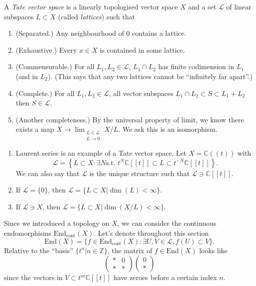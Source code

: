 \begin{definition}
\label{definition-tate}
A {\it Tate vector space} is a linearly
topologised vector space $X$ and a set
$\mathcal{L}$
of linear subspaces $L \subset X$
(called {\it lattices}) such that
\begin{enumerate}
\item (Separated.) Any neighbourhood of $0$
contains
a lattice.

\item (Exhaustive.) Every $x \in X$
is contained in some lattice.

\item (Commensurable.) For all $L_1,L_2 \in
\mathcal{L}$,
$L_1 \cap L_2$ has finite codimension
in $L_1$ (and in $L_2$). (This says
that any two lattices cannot be
``infinitely far apart''.)

\item (Complete.) For all $L_1,L_2 \in
\mathcal{L}$,
all vector subspaces
$L_1 \cap L_2 \subset S \subset L_1+L_2$
then $S \in \mathcal{L}$.

\item (Another completeness.) By the
universal property of limit,
we know there exists a map
$X \to \lim_{\substack{L \in \mathcal{L} \\ L
\to 0}} X/L$.
We ask this is an isomorphism.
\end{enumerate}
\end{definition}

\begin{example}
\label{example-tate-vector-space}
\begin{enumerate}
\item
Laurent series is an example of a Tate vector
space.
Let $X=\mathbb{C}(\!(t)\!)$ with
 $$
\mathcal{L}=\left\{L\subset X:\exists N\text{
s.t. }
t^N \mathbb{C}[\![t]\!] \subset L \subset
t^{-N}\mathbb{C}[\![t]\!]\right\}.
$$
We can also say that $\mathcal{L}$ is the
unique structure such that $\mathcal{L} \ni
\mathbb{C}[\![t]\!]$.

\item If $\mathcal{L}=\{0\}$,
then $\mathcal{L}=\{L \subset X |
\dim(L)<\infty\}$.

\item If $\mathcal{L}\ni X$, then
$\mathcal{L}=\{L \subset
X|\dim(X/L)<\infty\}$.
\end{enumerate}
\end{example}

\noindent
Since we introduced a topology on $X$,
we can consider the continuous endomorphisms
$\text{End}_{\text{cont}}(X)$.
Let's denote throughout this section
 $$
\text{End}(X)=\{f \in
\text{End}_{\text{cont}}(X)
:\exists U,V \in \mathcal{L}, f(U)\subset
V\}.
$$
Relative to the ``basis''
$\{t^n|n \in \mathbb{Z}\}$,
the matrix of $f \in \text{End}(X)$
looks like
$$
\begin{pmatrix}
*&0\\
*&*
\end{pmatrix}
\begin{pmatrix}
0\\
*
\end{pmatrix}
$$
since the vectors in $V\subset
t^m\mathbb{C}[\![t]\!]$
have zeroes before a certain index $n$.


